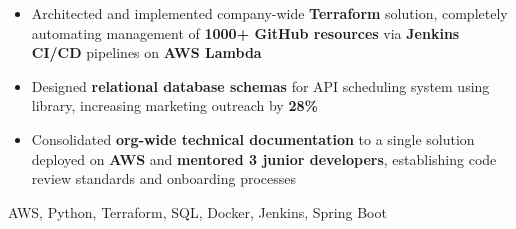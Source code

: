 \begin{experiences}
{\begin{itemize}
                        \item Architected and implemented company-wide \textbf{Terraform} solution, completely automating management of \textbf{1000+ GitHub resources} via \textbf{Jenkins CI/CD} pipelines on \textbf{AWS Lambda}

                        \item Designed \textbf{relational database schemas} for API scheduling system using  library, increasing marketing outreach by \textbf{28\%}
                        
                        \item Consolidated \textbf{org-wide technical documentation} to a single  solution deployed on \textbf{AWS} and \textbf{mentored 3 junior developers}, establishing code review standards and onboarding processes
                    \end{itemize}
                    }
                    {AWS, Python, Terraform, SQL, Docker, Jenkins, Spring Boot}
\end{experiences}
